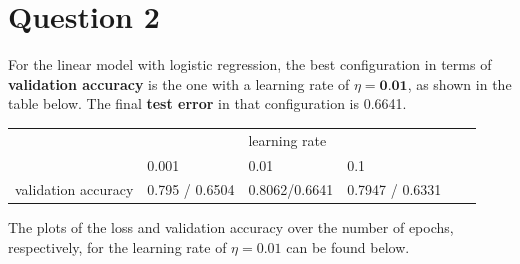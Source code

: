 \begin{questions}
\begin{parts}
            
            

        \end{parts}

    \end{questions}

    \section*{Question 2}

    \begin{questions}
        \question %
        For the linear model with logistic regression, the best configuration in terms of \textbf{validation accuracy} is the one with 
 a learning rate of $\eta = \textbf{0.01}$, as shown in the table below. The final \textbf{test error} in that configuration is 0.6641.
        
        \begin{table}[h!]
            \centering
            \begin{tabular}{l|lllll}
                                &                                     & learning rate                      &                 &  &  \\ \cline{2-4}
                                & \multicolumn{1}{l|}{0.001}          & \multicolumn{1}{l|}{0.01}          & 0.1             &  &  \\ \cline{1-4}
            validation accuracy & \multicolumn{1}{l|}{0.795 / 0.6504} & \multicolumn{1}{l|}{0.8062/0.6641} & 0.7947 / 0.6331 &  & 
            \end{tabular}
        \end{table}

    \newpage

        The plots of the loss and validation accuracy over the number of epochs, respectively, for the learning rate of $\eta = 0.01$ can be found below.


\end{questions}
